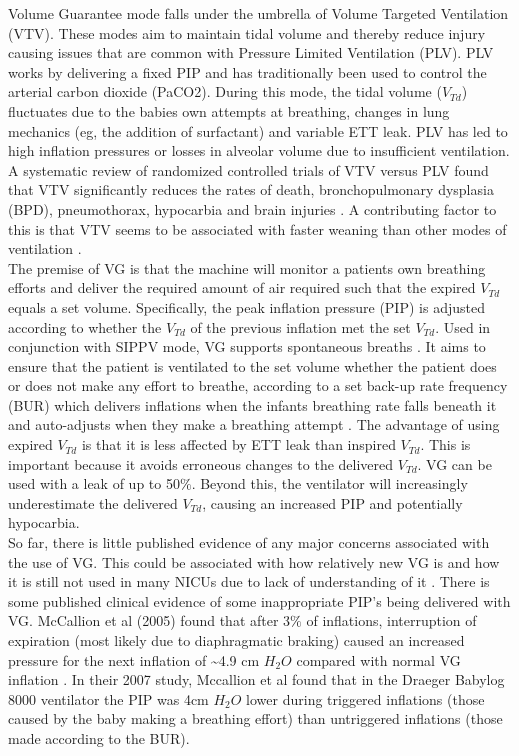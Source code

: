 \documentclass[12pt, openany, oneside]{book}
\begin{document}
Volume Guarantee mode falls under the umbrella of Volume Targeted Ventilation (VTV). These modes aim to maintain tidal volume and thereby reduce injury causing issues that are common with Pressure Limited Ventilation (PLV). PLV works by delivering a fixed PIP and has traditionally been used to control the arterial carbon dioxide (PaCO2). During this mode, the tidal volume ($V_{Td}$) fluctuates due to the babies own attempts at breathing, changes in lung mechanics (eg, the addition of surfactant) and variable ETT leak. PLV has led to high inflation pressures or losses in alveolar volume due to insufficient ventilation. A systematic review of randomized controlled trials of VTV versus PLV found that VTV significantly reduces the rates of death, bronchopulmonary dysplasia (BPD), pneumothorax, hypocarbia and brain injuries \cite{practical}. A contributing factor to this is that VTV seems to be associated with faster weaning than other modes of ventilation \cite{evidence}.\\
 

The premise of VG is that the machine will monitor a patients own breathing efforts and deliver the required amount of air required such that the expired $V_{Td}$ equals a set volume. Specifically, the peak inflation pressure (PIP)  is adjusted according to whether the $V_{Td}$ of the previous inflation met the set $V_{Td}$. Used in conjunction with SIPPV mode, VG supports spontaneous breaths \cite{practical}. It aims to ensure that the patient is ventilated to the set volume whether the patient does or does not make any effort to breathe, according to a set back-up rate frequency (BUR) which delivers inflations when the infants breathing rate falls beneath it and auto-adjusts when they make a breathing attempt \cite{mccallion2008}. The advantage of using expired $V_{Td}$ is that it is less affected by ETT leak than inspired $V_{Td}$. This is important because it avoids erroneous changes to the delivered $V_{Td}$. VG can be used with a leak of up to 50$\%$. Beyond this, the ventilator will increasingly underestimate the delivered $V_{Td}$, causing an increased PIP and potentially hypocarbia.\\

So far, there is little published evidence of any major concerns associated with the use of VG. This could be associated with how relatively new VG is and how it is still not used in many NICUs due to lack of understanding of it \cite{muzza}. There is some published clinical evidence of some inappropriate PIP's being delivered with VG. McCallion et al (2005) found that after 3$\%$ of inflations, interruption of expiration (most likely due to diaphragmatic braking) caused an increased pressure for the next inflation of \~{}4.9 cm $H_{2}O$ compared with normal VG inflation \cite{mccallion2005}. In their 2007 study, Mccallion et al found that in the Draeger Babylog 8000 ventilator the PIP was 4cm $H_{2}O$ lower during triggered inflations (those caused by the baby making a breathing effort) than untriggered inflations (those made according to the BUR)\cite{mccallion2008}.\\
\end{document}
